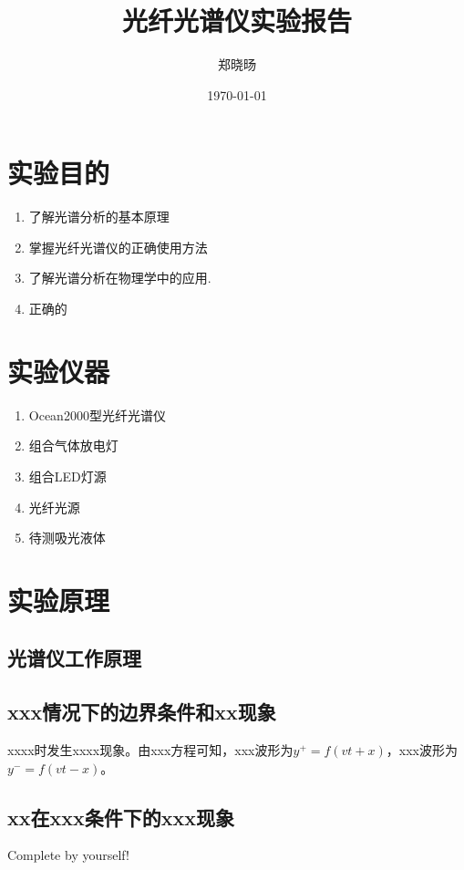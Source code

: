 \documentclass[UTF8]{ctexart}
\title{光纤光谱仪实验报告}
\author{郑晓旸}
\date{\today}
\begin{document}
\fancyfoot[C]{\thepage}

\maketitle
\tableofcontents
\newpage

\section{实验目的}
    \begin{enumerate}
            \item 了解光谱分析的基本原理
            \item 掌握光纤光谱仪的正确使用方法
            \item 了解光谱分析在物理学中的应用.
            \item 正确的
    \end{enumerate} 


\section{实验仪器}
\begin{enumerate}
    \item Ocean2000型光纤光谱仪
    \item 组合气体放电灯
    \item 组合LED灯源
    \item 光纤光源
    \item 待测吸光液体
\end{enumerate}

\section{实验原理}

\subsection{光谱仪工作原理}


\subsection{xxx情况下的边界条件和xx现象}
xxxx时发生xxxx现象。由xxx方程可知，xxx波形为$y^+=f(vt+x)$，xxx波形为$y^-=f(vt-x)$。

\subsection{xx在xxx条件下的xxx现象}
Complete by yourself!
\end{document}
